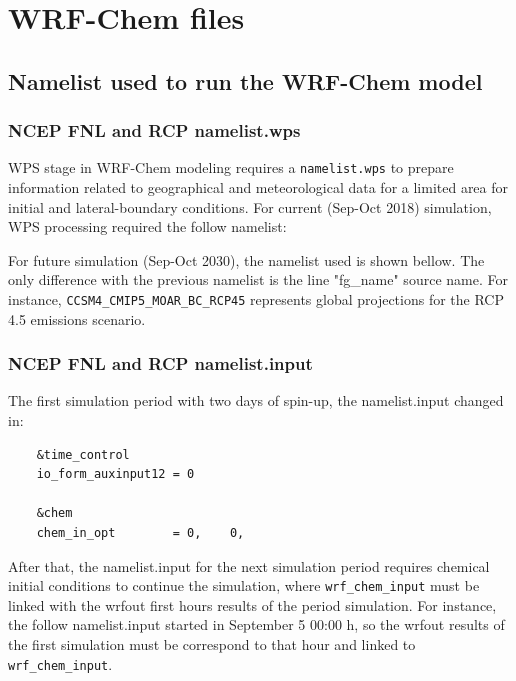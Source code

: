 \chapter{WRF-Chem files}
%
\section{Namelist used to run the WRF-Chem model}\label{ap03}
\subsection{NCEP FNL and RCP namelist.wps}
WPS stage in WRF-Chem modeling requires a \verb|namelist.wps| to prepare information related to geographical and meteorological data for a limited area for initial and lateral-boundary conditions.
For current (Sep-Oct 2018) simulation, WPS processing required the follow namelist:

	\begin{singlespace*}
		{\scriptsize }
	\end{singlespace*}
For future simulation (Sep-Oct 2030), the namelist used is shown bellow.
The only difference with the previous namelist is the line "fg\_name" source name.
For instance, \verb|CCSM4_CMIP5_MOAR_BC_RCP45| represents global projections for the RCP 4.5 emissions scenario.
\newpage
\begin{singlespace*}
	{\scriptsize }
\end{singlespace*}


\subsection{NCEP FNL and RCP namelist.input}
The first simulation period with two days of spin-up, the namelist.input changed in:

\begin{singlespace*}
{\scriptsize
	\begin{verbatim}
	&time_control
	io_form_auxinput12 = 0

	&chem
	chem_in_opt        = 0,    0, 
	\end{verbatim}
}
\end{singlespace*}

After that, the namelist.input for the next simulation period requires chemical initial conditions to continue the simulation, where \verb|wrf_chem_input| must be linked with the wrfout first hours results of the period simulation.
For instance, the follow namelist.input started in September 5 00:00 h, so the wrfout results of the first simulation must be correspond to that hour and linked to \verb|wrf_chem_input|.
 
